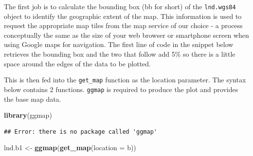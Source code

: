 \documentclass[]{article}
\newenvironment{Shaded}{}{}
\newcommand{\KeywordTok}[1]{\textcolor[rgb]{0.00,0.44,0.13}{\textbf{{#1}}}}
\newcommand{\DataTypeTok}[1]{\textcolor[rgb]{0.56,0.13,0.00}{{#1}}}
\newcommand{\DecValTok}[1]{\textcolor[rgb]{0.25,0.63,0.44}{{#1}}}
\newcommand{\FloatTok}[1]{\textcolor[rgb]{0.25,0.63,0.44}{{#1}}}
\newcommand{\StringTok}[1]{\textcolor[rgb]{0.25,0.44,0.63}{{#1}}}
\newcommand{\CommentTok}[1]{\textcolor[rgb]{0.38,0.63,0.69}{\textit{{#1}}}}
\newcommand{\NormalTok}[1]{{#1}}
\begin{document}
The first job is to calculate the bounding box (bb for short) of the
\texttt{lnd.wgs84} object to identify the geographic extent of the map.
This information is used to request the appropriate map tiles from the
map service of our choice - a process conceptually the same as the size
of your web browser or smartphone screen when using Google maps for
navigation. The first line of code in the snippet below retrieves the
bounding box and the two that follow add 5\% so there is a little space
around the edges of the data to be plotted.

\begin{Shaded}
\end{Shaded}

This is then fed into the \texttt{get\_map} function as the location
parameter. The syntax below contains 2 functions. \texttt{ggmap} is
required to produce the plot and provides the base map data.

\begin{Shaded}
\begin{Highlighting}[]
\KeywordTok{library}\NormalTok{(ggmap)}
\end{Highlighting}
\end{Shaded}

\begin{verbatim}
## Error: there is no package called 'ggmap'
\end{verbatim}

\begin{Shaded}
\begin{Highlighting}[]

\NormalTok{lnd.b1 <-}\StringTok{ }\KeywordTok{ggmap}\NormalTok{(}\KeywordTok{get_map}\NormalTok{(}\DataTypeTok{location =} \NormalTok{b))}
\end{Highlighting}
\end{Shaded}
\end{document}
